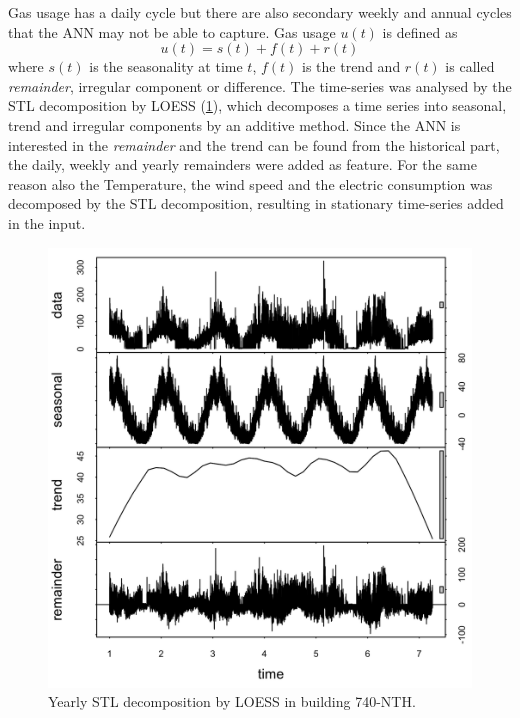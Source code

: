 \documentclass{sig-alternate-sigmod07}
\begin{document}
Gas usage has a daily cycle but there are also secondary weekly and annual cycles that the ANN may not be able to capture. Gas usage $u(t)$ is defined as \begin{displaymath}u(t) = s(t) + f(t) + r(t)\end{displaymath} where $s(t)$ is the seasonality at time $t$, $f(t)$ is the trend and $r(t)$ is called \emph{remainder}, irregular component or difference. The time-series was analysed by the STL decomposition by LOESS \cite{cleveland1990stl}(\cref{fig:STL}), which decomposes a time series into seasonal, trend and irregular components by an additive method. Since the ANN is interested in the \emph{remainder} and the trend can be found from the historical part, the daily, weekly and yearly remainders were added as feature. For the same reason also the Temperature, the wind speed and the electric consumption was decomposed by the STL decomposition, resulting in stationary time-series added in the input.

\begin{figure}
\centering
\includegraphics[width=\columnwidth]{STL.png}
\caption{Yearly STL decomposition by LOESS in building 740-NTH.}
\label{fig:STL}
\end{figure}
\end{document}
